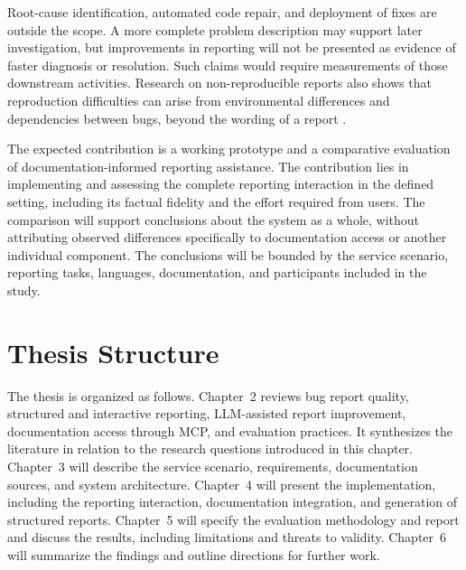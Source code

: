 Root-cause identification, automated code repair, and deployment of fixes are outside the scope. A more complete problem description may support later investigation, but improvements in reporting will not be presented as evidence of faster diagnosis or resolution. Such claims would require measurements of those downstream activities. Research on non-reproducible reports also shows that reproduction difficulties can arise from environmental differences and dependencies between bugs, beyond the wording of a report \cite{joorabchi2014}.

The expected contribution is a working prototype and a comparative evaluation of documentation-informed reporting assistance. The contribution lies in implementing and assessing the complete reporting interaction in the defined setting, including its factual fidelity and the effort required from users. The comparison will support conclusions about the system as a whole, without attributing observed differences specifically to documentation access or another individual component. The conclusions will be bounded by the service scenario, reporting tasks, languages, documentation, and participants included in the study.

\section{Thesis Structure}
\label{sec:structure}

The thesis is organized as follows. Chapter~2 reviews bug report quality, structured and interactive reporting, LLM-assisted report improvement, documentation access through MCP, and evaluation practices. It synthesizes the literature in relation to the research questions introduced in this chapter. Chapter~3 will describe the service scenario, requirements, documentation sources, and system architecture. Chapter~4 will present the implementation, including the reporting interaction, documentation integration, and generation of structured reports. Chapter~5 will specify the evaluation methodology and report and discuss the results, including limitations and threats to validity. Chapter~6 will summarize the findings and outline directions for further work.
